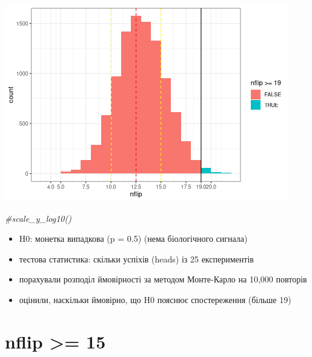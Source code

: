 \documentclass[
  10pt,
]{article}
\newenvironment{Shaded}{\begin{snugshade}}{\end{snugshade}}
\newcommand{\CommentTok}[1]{\textcolor[rgb]{0.56,0.35,0.01}{\textit{#1}}}
\providecommand{\tightlist}{%
  \setlength{\itemsep}{0pt}\setlength{\parskip}{0pt}}
\begin{document}
\includegraphics{05.pvalues_files/figure-latex/unnamed-chunk-5-1.png}

\begin{Shaded}
\begin{Highlighting}[]
\CommentTok{\#scale\_y\_log10()}
\end{Highlighting}
\end{Shaded}

\begin{itemize}
\tightlist
\item
  H0: монетка випадкова (p = 0.5) (нема біологічного сигнала)
\item
  тестова статистика: скільки успіхів (heads) із 25 експериментів
\item
  порахували розподіл ймовірності за методом Монте-Карло на 10,000
  повторів
\item
  оцінили, наскільки ймовірно, що H0 пояснює спостереження (більше 19)
\end{itemize}

\newpage

\hypertarget{nflip-15}{%
\section{nflip \textgreater= 15}\label{nflip-15}}
\end{document}
